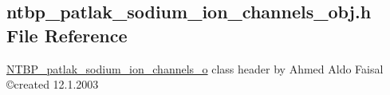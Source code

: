 \subsection{ntbp\_\-patlak\_\-sodium\_\-ion\_\-channels\_\-obj.h File Reference}
\label{ntbp__patlak__sodium__ion__channels__obj_8h}



\begin{DoxyItemize}
\item \hyperlink{class_n_t_b_p__patlak__sodium__ion__channels__o}{NTBP\_\-patlak\_\-sodium\_\-ion\_\-channels\_\-o} class header by Ahmed Aldo Faisal \copyright created 12.1.2003 
\end{DoxyItemize} 


